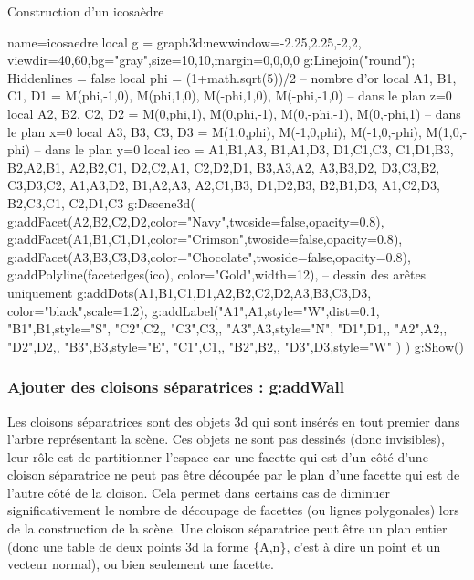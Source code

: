 \begin{demo}{Construction d'un icosaèdre}
\begin{luadraw}{name=icosaedre}
local g = graph3d:new{window={-2.25,2.25,-2,2}, viewdir={40,60},bg="gray",size={10,10},margin={0,0,0,0}}
g:Linejoin("round"); Hiddenlines = false
local phi = (1+math.sqrt(5))/2 -- nombre d'or
local A1, B1, C1, D1 = M(phi,-1,0), M(phi,1,0), M(-phi,1,0), M(-phi,-1,0) -- dans le plan z=0
local A2, B2, C2, D2 = M(0,phi,1), M(0,phi,-1), M(0,-phi,-1), M(0,-phi,1) -- dans le plan x=0
local A3, B3, C3, D3 = M(1,0,phi), M(-1,0,phi), M(-1,0,-phi), M(1,0,-phi) -- dans le plan y=0
local ico = {   {A1,B1,A3}, {B1,A1,D3}, {D1,C1,C3}, {C1,D1,B3},
                {B2,A2,B1}, {A2,B2,C1}, {D2,C2,A1}, {C2,D2,D1},
                {B3,A3,A2}, {A3,B3,D2}, {D3,C3,B2}, {C3,D3,C2},
                {A1,A3,D2}, {B1,A2,A3}, {A2,C1,B3}, {D1,D2,B3},
                {B2,B1,D3}, {A1,C2,D3}, {B2,C3,C1}, {C2,D1,C3}  }
g:Dscene3d(
    g:addFacet({A2,B2,C2,D2},{color="Navy",twoside=false,opacity=0.8}),
    g:addFacet({A1,B1,C1,D1},{color="Crimson",twoside=false,opacity=0.8}),
    g:addFacet({A3,B3,C3,D3},{color="Chocolate",twoside=false,opacity=0.8}),
    g:addPolyline(facetedges(ico), {color="Gold",width=12}), -- dessin des arêtes uniquement
    g:addDots({A1,B1,C1,D1,A2,B2,C2,D2,A3,B3,C3,D3}, {color="black",scale=1.2}),
    g:addLabel("A1",A1,{style="W",dist=0.1}, "B1",B1,{style="S"}, "C2",C2,{}, "C3",C3,{}, "A3",A3,{style="N"}, "D1",D1,{},  "A2",A2,{},  "D2",D2,{}, "B3",B3,{style="E"}, "C1",C1,{}, "B2",B2,{}, "D3",D3,{style="W"} )
)
g:Show()
\end{luadraw}
\end{demo}

\subsubsection{Ajouter des cloisons séparatrices : g:addWall}

Les cloisons séparatrices sont des objets 3d qui sont insérés en tout premier dans l'arbre représentant la scène. Ces objets ne sont pas dessinés (donc invisibles), leur rôle est de partitionner l'espace car une facette qui est d'un côté d'une cloison séparatrice ne peut pas être découpée par le plan d'une facette qui est de l'autre côté de la cloison. Cela permet dans certains cas de diminuer significativement le nombre de découpage de facettes (ou lignes polygonales) lors de la construction de la scène. Une cloison séparatrice peut être un plan entier (donc une table de deux points 3d la forme \{A,n\}, c'est à dire un point et un vecteur normal), ou bien seulement une facette.


